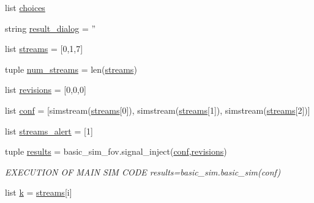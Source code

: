 \begin{DoxyCompactItemize}
list \hyperlink{namespaceamonpy_1_1tools_1_1calc__fov_a1bc07dd3b189b89d03cd6bfb2ff9378f}{choices}
\item 
string \hyperlink{namespaceamonpy_1_1tools_1_1calc__fov_af2bbe22561fc8fb6837ea58b5d8a0cd4}{result\-\_\-dialog} = ''
\item 
list \hyperlink{namespaceamonpy_1_1tools_1_1calc__fov_a0d65e01c12947128d7aed9b6751a5159}{streams} = \mbox{[}0,1,7\mbox{]}
\item 
tuple \hyperlink{namespaceamonpy_1_1tools_1_1calc__fov_ab98f07a49951b24807130f86a97aa904}{num\-\_\-streams} = len(\hyperlink{namespaceamonpy_1_1tools_1_1calc__fov_a0d65e01c12947128d7aed9b6751a5159}{streams})
\item 
list \hyperlink{namespaceamonpy_1_1tools_1_1calc__fov_ad4753f6c1a088c4b50d3ba93205b751a}{revisions} = \mbox{[}0,0,0\mbox{]}
\item 
list \hyperlink{namespaceamonpy_1_1tools_1_1calc__fov_af4b4c00c118d28fce747695a24f9893a}{conf} = \mbox{[}simstream(\hyperlink{namespaceamonpy_1_1tools_1_1calc__fov_a0d65e01c12947128d7aed9b6751a5159}{streams}\mbox{[}0\mbox{]}), simstream(\hyperlink{namespaceamonpy_1_1tools_1_1calc__fov_a0d65e01c12947128d7aed9b6751a5159}{streams}\mbox{[}1\mbox{]}), simstream(\hyperlink{namespaceamonpy_1_1tools_1_1calc__fov_a0d65e01c12947128d7aed9b6751a5159}{streams}\mbox{[}2\mbox{]})\mbox{]}
\item 
list \hyperlink{namespaceamonpy_1_1tools_1_1calc__fov_a3bf1158446321df85f814bae76c9c168}{streams\-\_\-alert} = \mbox{[}1\mbox{]}
\item 
tuple \hyperlink{namespaceamonpy_1_1tools_1_1calc__fov_a4bc31903fbe30c866faaa99229b67d5b}{results} = basic\-\_\-sim\-\_\-fov.\-signal\-\_\-inject(\hyperlink{namespaceamonpy_1_1tools_1_1calc__fov_af4b4c00c118d28fce747695a24f9893a}{conf},\hyperlink{namespaceamonpy_1_1tools_1_1calc__fov_ad4753f6c1a088c4b50d3ba93205b751a}{revisions})
\begin{DoxyCompactList}\small\item\em E\-X\-E\-C\-U\-T\-I\-O\-N O\-F M\-A\-I\-N S\-I\-M C\-O\-D\-E results=basic\-\_\-sim.\-basic\-\_\-sim(conf) \end{DoxyCompactList}\item 
list \hyperlink{namespaceamonpy_1_1tools_1_1calc__fov_a4c3759f624220d1b1baf047a412a779b}{k} = \hyperlink{namespaceamonpy_1_1tools_1_1calc__fov_a0d65e01c12947128d7aed9b6751a5159}{streams}\mbox{[}i\mbox{]}
\end{DoxyCompactItemize}



